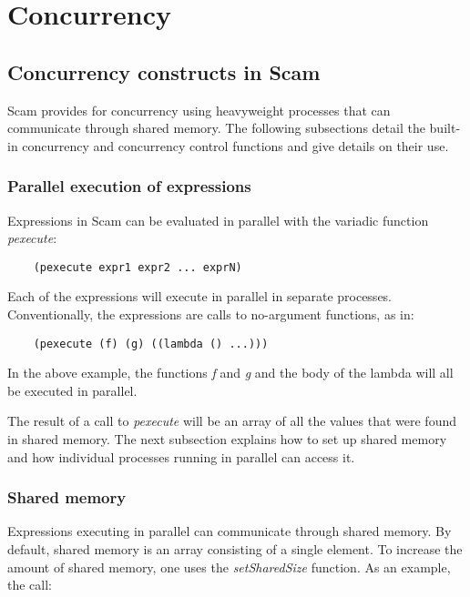 \chapter{Concurrency}
\label{Concurrency}

\section{Concurrency constructs in Scam}

Scam provides for concurrency using heavyweight processes that
can communicate through shared memory. The following subsections
detail the built-in concurrency and concurrency control
functions and give details on
their use.

\subsection{Parallel execution of expressions}

Expressions in Scam can be evaluated in parallel with the variadic function
{\it pexecute}:

\begin{verbatim}
    (pexecute expr1 expr2 ... exprN)
\end{verbatim}

Each of the expressions will execute in parallel in separate processes.
Conventionally, the expressions are calls to no-argument functions, as in:

\begin{verbatim}
    (pexecute (f) (g) ((lambda () ...)))
\end{verbatim}

In the above example, the functions {\it f} and {\it g}
and the body of the lambda
will all be executed in parallel.

The result of a call to {\it pexecute} will be an array of all the values
that were found in shared memory.
The next subsection explains how to set up shared
memory and how individual processes running in parallel can access
it.

\subsection{Shared memory}

Expressions executing in parallel can communicate through shared memory.
By default, shared memory is an array consisting of a single element.
To increase the amount of shared memory, one uses the {\it setSharedSize}
function.
As an example, the call:

